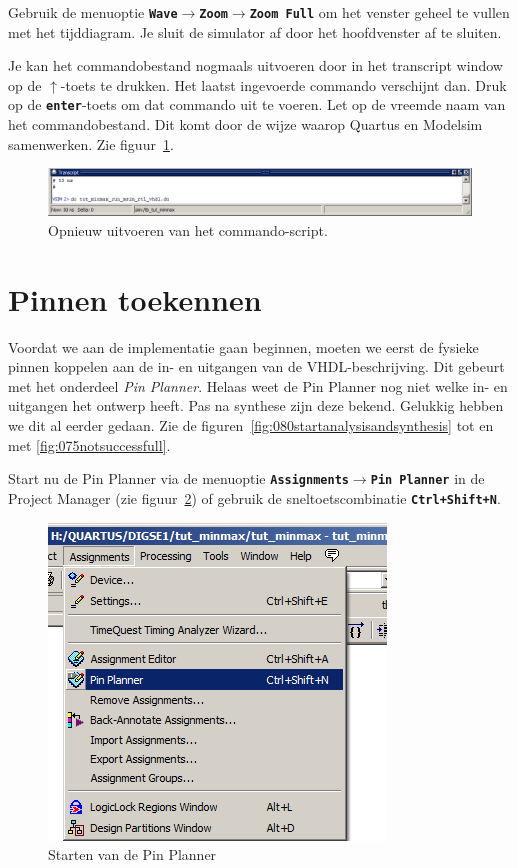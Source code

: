 \documentclass[a4paper,12pt,fleqn,twoside]{book}
\def\tutpicscale{0.455}
\newcommand{\menu}[1]{\texttt{\textbf{#1}}}
\def\pijl{$\rightarrow$}%
\begin{document}
Gebruik de menuoptie \menu{Wave\pijl{}Zoom\pijl{}Zoom Full} om het venster geheel te vullen met het 
tijddiagram. Je sluit de simulator af door het hoofdvenster af te sluiten.

Je kan het commandobestand nogmaals uitvoeren door in het transcript window op de $\uparrow$-toets te 
drukken. Het laatst ingevoerde commando verschijnt dan. Druk op de \menu{enter}-toets om dat 
commando uit te voeren. Let op de vreemde naam van het commandobestand. Dit komt door de 
wijze waarop Quartus en Modelsim samenwerken. Zie figuur~\ref{fig:078rundofileagainfrommodelsim}.
 
\begin{figure}[H]
\centering
\includegraphics[scale=\tutpicscale]{078rundofileagainfrommodelsim.png}
\caption{Opnieuw uitvoeren van het commando-script.}
\label{fig:078rundofileagainfrommodelsim}
\end{figure}

\section{Pinnen toekennen}
\label{sec:pinnentoekennen}
Voordat we aan de implementatie gaan beginnen, moeten we eerst de fysieke pinnen koppelen 
aan de in- en uitgangen van de VHDL-beschrijving. Dit gebeurt met het onderdeel \textsl{Pin Planner}. 
Helaas weet de Pin Planner nog niet welke in- en uitgangen het ontwerp heeft. Pas na synthese 
zijn deze bekend. Gelukkig hebben we dit al eerder gedaan. Zie de figuren~\ref{fig:080startanalysisandsynthesis} tot en met
\ref{fig:075notsuccessfull}.

Start nu de Pin Planner via de menuoptie \menu{Assignments\pijl{}Pin Planner} in de Project 
Manager (zie figuur~\ref{fig:082startpinplanner}) of gebruik de sneltoetscombinatie \menu{Ctrl+Shift+N}.

\begin{figure}[H]
\centering
\includegraphics[scale=\tutpicscale]{082startpinplanner.png}
\caption{Starten van de Pin Planner}
\label{fig:082startpinplanner}
\end{figure}
 
\end{document}
